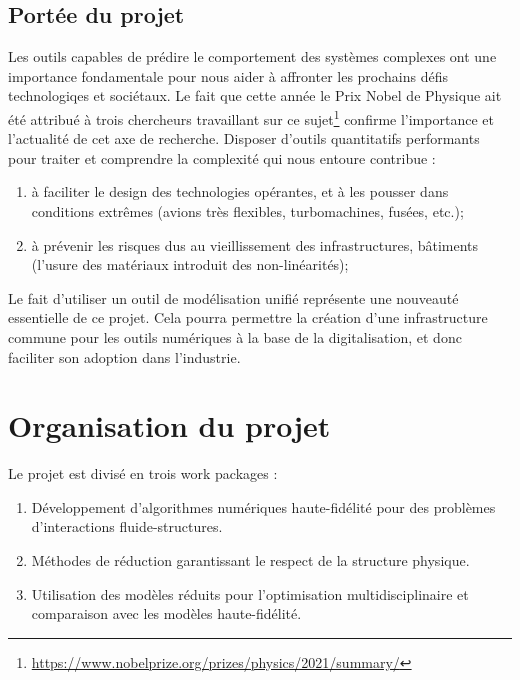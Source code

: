 \documentclass[12pt, french]{article}
\begin{document}
\subsection{Portée du projet}

Les outils capables de prédire le comportement des systèmes complexes ont une importance
fondamentale pour nous aider à affronter les prochains défis technologiqes et sociétaux. Le fait que cette année le Prix Nobel de Physique ait été attribué à trois chercheurs travaillant sur ce sujet\footnote{\url{https://www.nobelprize.org/prizes/physics/2021/summary/}} confirme
l’importance et l’actualité de cet axe de recherche. Disposer d'outils quantitatifs performants pour traiter et comprendre la complexité qui nous entoure contribue :

\begin{enumerate}
	\item à faciliter le design des technologies opérantes, et à les pousser dans conditions extrêmes
	(avions très flexibles, turbomachines, fusées, etc.);
	\item à prévenir les risques dus au vieillissement des infrastructures, bâtiments (l’usure
	des matériaux introduit des non-linéarités);
\end{enumerate} 

Le fait d’utiliser un outil de modélisation unifié représente une nouveauté essentielle de ce projet.
Cela pourra permettre la création d’une infrastructure commune pour les outils numériques à la base de la digitalisation,  et donc faciliter son adoption dans l'industrie.


\section{Organisation du projet}
Le projet est divisé en trois work packages :

\begin{enumerate}
	\item Développement d'algorithmes numériques haute-fidélité pour des problèmes d'interactions fluide-structures.
	\item Méthodes de réduction garantissant le respect de la structure physique. 
	\item Utilisation des modèles réduits pour l'optimisation multidisciplinaire et comparaison avec les  modèles haute-fidélité.
\end{enumerate}
\end{document}

